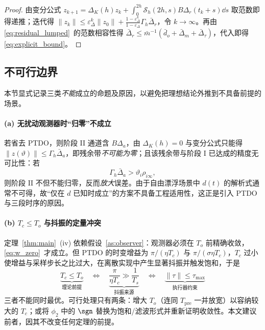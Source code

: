 \begin{proof}
由变分公式 \(z_{k+1}=\Delta_K(h)z_k+\int_0^{2h}\mathcal S_h(2h,s)B\Delta_r(t_k+s)\dd s\) 取范数即得递推；迭代得 \(\lVert z_k\rVert\le\varepsilon_\Delta^k\lVert z_0\rVert+\frac{1-\varepsilon_\Delta^k}{1-\varepsilon_\Delta}\Gamma_h\bar\Delta_r\)，令 \(k\to\infty\)。再由 \eqref{eq:residual_lumped}~的范数相容性得 \(\bar\Delta_r\le\bar m^{-1}(\bar d_o+\bar\Delta_m+\bar\Delta_\tau)\)，代入即得 \eqref{eq:explicit_bound}。
\end{proof}

\subsection{不可行边界}
\label{sec:infeasible}

本节显式记录三类\emph{不能}成立的命题及原因，以避免把理想结论外推到不具备前提的场景。

\paragraph{(a) 无扰动观测器时“归零”不成立}
若省去 PTDO，则阶段 II 通道含 \(B\Delta_a\)，由 \(\Delta_K(h)=0\) 与变分公式只能得 \(\lVert z(\vartheta)\rVert\le\Gamma_h\bar\Delta_a\)，即残余带\emph{不可能为零}；且该残余带与阶段 I 已达成的精度无可比性：若
\begin{equation}
\Gamma_h\bar\Delta_a>\vartheta_i\rho_{i\infty},
\label{eq:no_observer}
\end{equation}
则阶段 II 不但不能归零，反而\emph{放大}误差。由于自由漂浮场景中 \(d(t)\) 的解析式通常不可得，故“仅在 \(d\) 已知时成立”的方案不具备工程适用性，这正是引入 PTDO 与三段时序的原因。

\paragraph{(b) \(T_c\le T_o\) 与抖振的定量冲突}
定理~\ref{thm:main}~(iv) 依赖假设~\ref{as:observer}：观测器必须在 \(T_o\) 前精确收敛，\eqref{eq:w_zero}~才成立。但 PTDO 的时变增益为 \(\pi/(\eta T_c)\) 与 \(\pi/(\sigma\eta T_c)\)，\(T_c\) 过小使增益与采样步长之比过大，在离散实现中产生显著抖振并触发饱和，于是
\begin{equation}
\underbrace{T_c\le T_o}_{\text{理论前提}}\quad\Longleftrightarrow\quad
\underbrace{\frac{\pi}{\eta T_c}\gg\frac{1}{T_s}}_{\text{抖振来源}}\quad\Longleftrightarrow\quad
\underbrace{\lVert\tau\rVert\le\tau_{\max}}_{\text{执行器约束}}
\label{eq:tc_tradeoff}
\end{equation}
三者不能同时最优。可行处理只有两条：增大 \(T_o\)（连同 \(T_{\mathrm{pre}}\) 一并放宽）以容纳较大的 \(T_c\)；或将 \(\phi_2\) 中的 \(\sgn\) 替换为饱和/滤波形式并重新证明收敛性。本文建议前者，因其不改变任何定理的前提。


